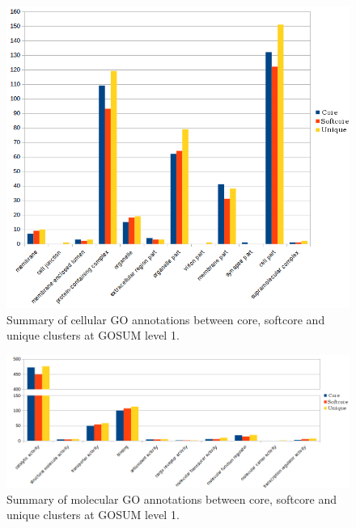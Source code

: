 \documentclass[12pt]{article}
\begin{document}
\begin{figure} 
\includegraphics[scale=.8]{3Aug18_cluster-investigation/figures/gosum-pan/Pan-gosum1-cell-split.png} 
\caption{Summary of cellular GO annotations between core, softcore and unique clusters at GOSUM level 1.} 
\label{fig:PanGo1Cell}
\end{figure} 
\FloatBarrier

\begin{figure} 
\includegraphics[scale=.6]{3Aug18_cluster-investigation/figures/gosum-pan/Pan-gosum1-molec-split.png} 
\caption{Summary of molecular GO annotations between core, softcore and unique clusters at GOSUM level 1.} 
\label{fig:PanGo1Molec}
\end{figure} 
\FloatBarrier
\end{document}
